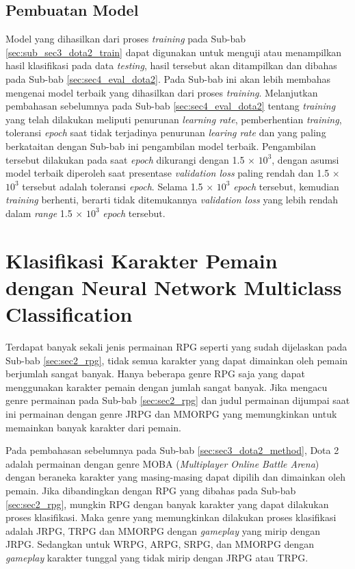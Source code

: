 \subsection{Pembuatan Model}
\label{sec:sub_sec3_dota2_model}
\vspace{1ex}

Model yang dihasilkan dari proses \textit{training} pada Sub-bab \ref{sec:sub_sec3_dota2_train} dapat digunakan untuk menguji atau menampilkan hasil klasifikasi pada data \textit{testing}, hasil tersebut akan ditampilkan dan dibahas pada Sub-bab \ref{sec:sec4_eval_dota2}. Pada Sub-bab ini akan lebih membahas mengenai model terbaik yang dihasilkan dari proses \textit{training}. Melanjutkan pembahasan sebelumnya pada Sub-bab \ref{sec:sec4_eval_dota2} tentang \textit{training} yang telah dilakukan meliputi penurunan \textit{learning rate}, pemberhentian \textit{training}, toleransi \textit{epoch} saat tidak terjadinya penurunan \textit{learing rate} dan yang paling berkataitan dengan Sub-bab ini pengambilan model terbaik. Pengambilan tersebut dilakukan pada saat \textit{epoch} dikurangi dengan 1.5 $\times$ $10^{3}$, dengan asumsi model terbaik diperoleh saat presentase \textit{validation loss} paling rendah dan 1.5 $\times$ $10^{3}$ tersebut adalah toleransi \textit{epoch}. Selama 1.5 $\times$ $10^{3}$ \textit{epoch} tersebut, kemudian \textit{training} berhenti, berarti tidak ditemukannya \textit{validation loss} yang lebih rendah dalam \textit{range} 1.5 $\times$ $10^{3}$ \textit{epoch} tersebut.
\vspace{1ex}

\section{Klasifikasi Karakter Pemain dengan Neural Network Multiclass Classification}
\label{sec:sec3_player_method}
\vspace{1ex}

Terdapat banyak sekali jenis permainan RPG seperti yang sudah dijelaskan pada Sub-bab \ref{sec:sec2_rpg}, tidak semua karakter yang dapat dimainkan oleh pemain berjumlah sangat banyak. Hanya beberapa genre RPG saja yang dapat menggunakan karakter pemain dengan jumlah sangat banyak. Jika mengacu genre permainan pada Sub-bab \ref{sec:sec2_rpg} dan judul permainan dijumpai saat ini permainan dengan genre JRPG dan MMORPG yang memungkinkan untuk memainkan banyak karakter dari pemain.
\vspace{1ex}

Pada pembahasan sebelumnya pada Sub-bab \ref{sec:sec3_dota2_method}, Dota 2 adalah permainan dengan genre MOBA (\textit{Multiplayer Online Battle Arena}) dengan beraneka karakter yang masing-masing dapat dipilih dan dimainkan oleh pemain. Jika dibandingkan dengan RPG yang dibahas pada Sub-bab \ref{sec:sec2_rpg}, mungkin RPG dengan banyak karakter yang dapat dilakukan proses klasifikasi. Maka genre yang memungkinkan dilakukan proses klasifikasi adalah JRPG, TRPG dan MMORPG dengan \textit{gameplay} yang mirip dengan JRPG. Sedangkan untuk WRPG, ARPG, SRPG, dan MMORPG dengan \textit{gameplay} karakter tunggal yang tidak mirip dengan JRPG atau TRPG.
\vspace{1ex}


